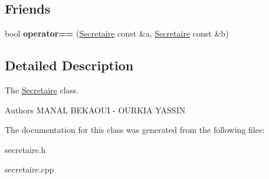 \subsection*{Friends}
\begin{DoxyCompactItemize}
\item 
\mbox{\label{class_secretaire_a112c35bb24507c5a861a7f84542bcdea}} 
bool {\bfseries operator==} (\mbox{\hyperlink{class_secretaire}{Secretaire}} const \&a, \mbox{\hyperlink{class_secretaire}{Secretaire}} const \&b)
\end{DoxyCompactItemize}


\subsection{Detailed Description}
The \mbox{\hyperlink{class_secretaire}{Secretaire}} class. 

\begin{DoxyAuthor}{Authors}
M\+A\+N\+AL B\+E\+K\+A\+O\+UI -\/ O\+U\+R\+K\+IA Y\+A\+S\+S\+IN 
\end{DoxyAuthor}


The documentation for this class was generated from the following files\+:\begin{DoxyCompactItemize}
\item 
secretaire.\+h\item 
secretaire.\+cpp\end{DoxyCompactItemize}
